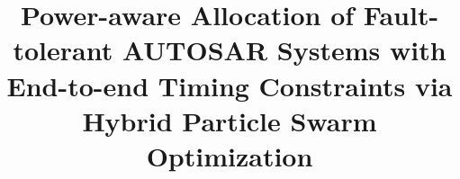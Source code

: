 \documentclass[preprint]{elsarticle}
\begin{document}
\sloppy
\begin{frontmatter}
\title{Power-aware Allocation of Fault-tolerant AUTOSAR Systems with End-to-end Timing Constraints via Hybrid Particle Swarm Optimization}


\end{frontmatter}





%
%








\end{document}
